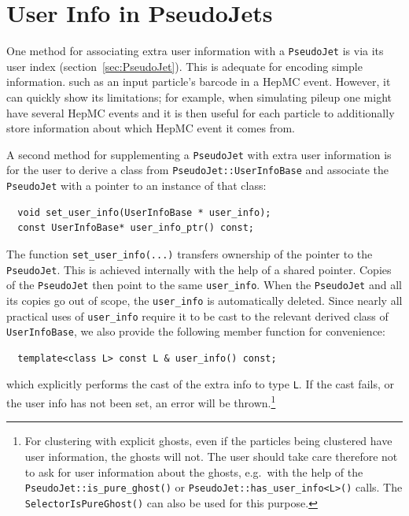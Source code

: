 \documentclass[12pt,a4]{article}
\newcommand{\ttt}[1]{{\small\texttt{#1}}}
\newcommand{\PJ}{\ttt{PseudoJet}\xspace}
\begin{document}
\section{User Info in PseudoJets}
\label{app:user-info}

One method for associating extra user information with a
\ttt{PseudoJet} is via its user index
(section~\ref{sec:PseudoJet}). This is adequate for encoding simple
information. such as an input particle's barcode in a HepMC
event.
%
However, it can quickly show its limitations; for example, when
simulating pileup one might have several HepMC events and it is then
useful for each particle to additionally store information about which
HepMC event it comes from.

A second method for supplementing a \PJ with extra user information is for
the user to derive a class from \ttt{PseudoJet::UserInfoBase} and
associate the \ttt{PseudoJet} with a pointer to an instance of that
class:
\begin{lstlisting}
  void set_user_info(UserInfoBase * user_info);
  const UserInfoBase* user_info_ptr() const;
\end{lstlisting}
The function \ttt{set\_user\_info(...)} transfers ownership of the
pointer to the \ttt{PseudoJet}. 
%
This is achieved internally with the help of a shared pointer. Copies
of the \ttt{PseudoJet} then point to the same \ttt{user\_info}.
%
When the \ttt{PseudoJet} and all its copies go out of scope, the
\ttt{user\_info} is automatically deleted.
%
Since nearly all practical uses of \ttt{user\_info} require it
to be cast to the relevant derived class of  \ttt{UserInfoBase}, we also
provide the following member function for convenience:
\begin{lstlisting}
  template<class L> const L & user_info() const;
\end{lstlisting}
which explicitly performs the cast of the extra info to type \ttt{L}.
%
If the cast fails, or the user info has not been set, an error
will be thrown.\footnote{%
  For clustering with explicit ghosts, even if the particles being
  clustered have user information, the ghosts will not. 
  The user should take care therefore not to ask for user information
  about the ghosts, e.g.\ with the help of the \texttt{PseudoJet::is\_pure\_ghost()}
  or \texttt{PseudoJet::has\_user\_info<L>()} calls.
  The \texttt{SelectorIsPureGhost()} can also be used for this purpose.
}
\end{document}
